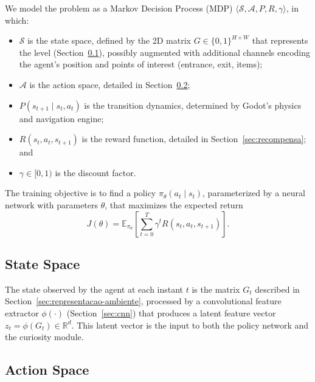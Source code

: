 \documentclass[sigconf,nonacm,language=english]{acmart}
\begin{document}
We model the problem as a Markov Decision Process (MDP) $\langle
\mathcal{S}, \mathcal{A}, P, R, \gamma \rangle$, in which:

\begin{itemize}
  \item $\mathcal{S}$ is the state space, defined by the 2D matrix $G \in
    \{0,1\}^{H \times W}$ that represents the level
    (Section~\ref{sec:representacao}), possibly augmented with additional
    channels encoding the agent's position and points of interest
    (entrance, exit, items);
  \item $\mathcal{A}$ is the action space, detailed in
    Section~\ref{sec:acao};
  \item $P(s_{t+1} \mid s_t, a_t)$ is the transition dynamics, determined
    by Godot's physics and navigation engine;
  \item $R(s_t, a_t, s_{t+1})$ is the reward function, detailed in
    Section~\ref{sec:recompensa}; and
  \item $\gamma \in [0,1)$ is the discount factor.
\end{itemize}

The training objective is to find a policy $\pi_\theta(a_t \mid s_t)$,
parameterized by a neural network with parameters $\theta$, that maximizes
the expected return
\begin{equation}
  J(\theta) = \mathbb{E}_{\pi_\theta}\!\left[ \sum_{t=0}^{T} \gamma^t
  R(s_t, a_t, s_{t+1}) \right].
  \label{eq:objective}
\end{equation}

\subsection{State Space}
\label{sec:representacao}

The state observed by the agent at each instant $t$ is the matrix $G_t$
described in Section~\ref{sec:representacao-ambiente}, processed by a
convolutional feature extractor $\phi(\cdot)$ (Section~\ref{sec:cnn}) that
produces a latent feature vector $z_t = \phi(G_t) \in \mathbb{R}^d$. This
latent vector is the input to both the policy network and the curiosity
module.

\subsection{Action Space}
\label{sec:acao}
\end{document}
